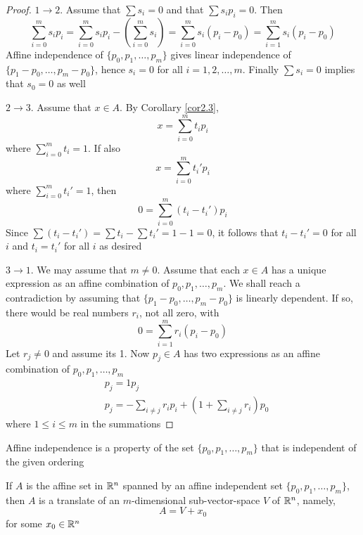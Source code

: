 \documentclass[11pt]{article}
\begin{document}
\begin{proof}
\(1\to 2\). Assume that \(\sum s_i=0\) and that \(\sum s_ip_i=0\). Then
\begin{equation*}
\sum_{i=0}^ms_ip_i=\sum_{i=0}^ms_ip_i-\left( \sum_{i=0}^ms_i \right)=
\sum_{i=0}^ms_i(p_i-p_0)=\sum_{i=1}^ms_i(p_i-p_0)
\end{equation*}
Affine independence of \(\{p_0,p_1,\dots,p_m\}\) gives linear independence of \(\{p_1-p_0,\dots,p_m-p_0\}\),
hence \(s_i=0\) for all \(i=1,2,\dots,m\). Finally \(\sum s_i=0\) implies that \(s_0=0\) as well

\(2\to 3\). Assume that \(x\in A\). By Corollary \ref{cor2.3},
\begin{equation*}
x=\sum_{i=0}^mt_ip_i
\end{equation*}
where \(\sum_{i=0}^mt_i=1\). If also
\begin{equation*}
x=\sum_{i=0}^mt_i'p_i
\end{equation*}
where \(\sum_{i=0}^mt_i'=1\), then
\begin{equation*}
0=\sum_{i=0}^m(t_i-t_i')p_i
\end{equation*}
Since \(\sum(t_i-t_i')=\sum t_i-\sum t_i'=1-1=0\), it follows that \(t_i-t_i'=0\) for all \(i\) and \(t_i=t_i'\)
for all \(i\) as desired

\(3\to 1\). We may assume that \(m\neq 0\). Assume that each \(x\in A\) has a unique expression as an
affine combination of \(p_0,p_1,\dots,p_m\). We shall reach a contradiction by assuming
that \(\{p_1-p_0,\dots,p_m-p_0\}\) is linearly dependent. If so, there would be real numbers \(r_i\), not
all zero, with
\begin{equation*}
0=\sum_{i=1}^mr_i(p_i-p_0)
\end{equation*}
Let \(r_j\neq 0\) and assume its 1. Now \(p_j\in A\)  has two expressions as an affine combination
of \(p_0,p_1,\dots,p_m\)
\begin{align*}
&p_j=1p_j\\
&p_j=-\sum_{i\neq j}r_ip_i+\left( 1+\sum_{i\neq j}r_i \right)p_0
\end{align*}
where \(1\le i\le m\) in the summations
\end{proof}

\begin{corollary}[]
Affine independence is a property of the set \(\{p_0,p_1,\dots,p_m\}\) that is independent of the given ordering
\end{corollary}

\begin{corollary}[]
If \(A\) is the affine set in \(\mathbb{R}^n\) spanned by an affine independent set \(\{p_0,p_1,\dots,p_m\}\),
then \(A\) is a translate of an \(m\)-dimensional sub-vector-space \(V\) of \(\mathbb{R}^n\), namely,
\begin{equation*}
A=V+x_0
\end{equation*}
for some \(x_0\in\mathbb{R}^n\)
\end{corollary}
\end{document}
